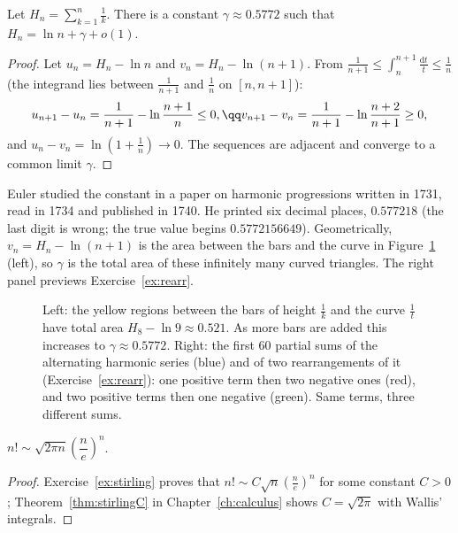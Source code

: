 \begin{proposition}\label{prop:gamma}
Let $H_n=\sum_{k=1}^n\frac1k$. There is a constant $\gamma\approx0.5772$ such that $H_n=\ln n+\gamma+o(1)$.
\end{proposition}
\begin{proof}
Let $u_n=H_n-\ln n$ and $v_n=H_n-\ln(n+1)$. From $\frac1{n+1}\le\int_n^{n+1}\frac{\mathrm dt}t\le\frac1n$ (the integrand lies between $\frac1{n+1}$ and $\frac1n$ on $[n,n+1]$):
\[
\begin{gathered}u_{n+1}-u_n=\frac1{n+1}-\ln\frac{n+1}n\le0,\qq v_{n+1}-v_n=\frac1{n+1}-\ln\frac{n+2}{n+1}\ge0,\end{gathered}
\]
and $u_n-v_n=\ln\left(1+\frac1n\right)\to0$. The sequences are adjacent and converge to a common limit $\gamma$.
\end{proof}

Euler studied the constant in a paper on harmonic progressions written in 1731, read in 1734 and published in 1740. He printed six decimal places, $0.577218$ (the last digit is wrong; the
true value begins $0.5772156649$). Geometrically, $v_n=H_n-\ln(n+1)$ is the area between the bars and the curve in Figure~\ref{fig:gamma} (left), so $\gamma$ is the total area of these
infinitely many curved triangles. The right panel previews Exercise~\ref{ex:rearr}.

\begin{figure}[ht]
\centering
{}
\caption{Left: the yellow regions between the bars of height $\frac1k$ and the curve $\frac1t$ have total area $H_8-\ln9\approx0.521$. As more bars are added this increases to $\gamma\approx0.5772$. Right: the first $60$ partial sums of the alternating harmonic series (blue) and of two rearrangements of it (Exercise~\ref{ex:rearr}): one positive term then two negative ones (red), and two positive terms then one negative (green). Same terms, three different sums.}
\label{fig:gamma}
\end{figure}

\begin{theorem}[Stirling]\label{thm:stirling}
$n!\sim\sqrt{2\pi n}\left(\dfrac ne\right)^n$.
\end{theorem}
\begin{proof}
Exercise~\ref{ex:stirling} proves that $n!\sim C\sqrt n\left(\frac ne\right)^n$ for some constant $C>0$; Theorem~\ref{thm:stirlingC} in Chapter~\ref{ch:calculus} shows $C=\sqrt{2\pi}$ with Wallis' integrals.
\end{proof}

